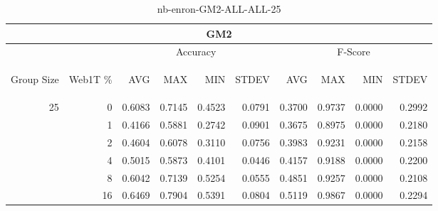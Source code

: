 \begin{center}
\begin{table}[htbp]
\begin{tabular}{ | r | r | r | r | r | r | r | r | r | r |}
\hline
\multicolumn{10}{|c|}{GM2}\\
\hline
 & & \multicolumn{4}{|c|}{Accuracy} & \multicolumn{4}{|c|}{F-Score}\\ \cline{3-10}
\begin{sideways}Group Size\end{sideways} & \begin{sideways}Web1T \%\end{sideways} & \begin{sideways}AVG\end{sideways} & \begin{sideways}MAX\end{sideways} & \begin{sideways}MIN\end{sideways} & \begin{sideways}STDEV\end{sideways} & \begin{sideways}AVG\end{sideways} & \begin{sideways}MAX\end{sideways} & \begin{sideways}MIN\end{sideways} & \begin{sideways}STDEV\end{sideways}\\
\hline
\multirow{5}{*}{25}
 & 0 & 0.6083 & 0.7145 & 0.4523 & 0.0791 & 0.3700 & 0.9737 & 0.0000 & 0.2992\\ \cline{2-10}
 & 1 & 0.4166 & 0.5881 & 0.2742 & 0.0901 & 0.3675 & 0.8975 & 0.0000 & 0.2180\\ \cline{2-10}
 & 2 & 0.4604 & 0.6078 & 0.3110 & 0.0756 & 0.3983 & 0.9231 & 0.0000 & 0.2158\\ \cline{2-10}
 & 4 & 0.5015 & 0.5873 & 0.4101 & 0.0446 & 0.4157 & 0.9188 & 0.0000 & 0.2200\\ \cline{2-10}
 & 8 & 0.6042 & 0.7139 & 0.5254 & 0.0555 & 0.4851 & 0.9257 & 0.0000 & 0.2108\\ \cline{2-10}
 & 16 & 0.6469 & 0.7904 & 0.5391 & 0.0804 & 0.5119 & 0.9867 & 0.0000 & 0.2294\\ \cline{2-10}
\hline
\end{tabular}
\caption{nb-enron-GM2-ALL-ALL-25}
\label{table:nb-enron-GM2-ALL-ALL-25}
\end{table}
\end{center}

